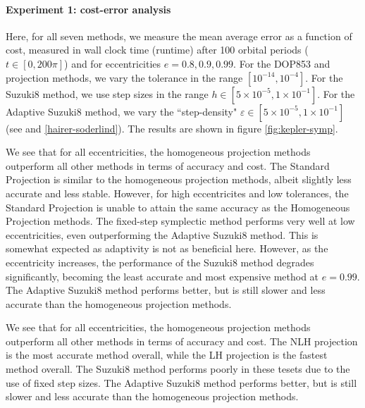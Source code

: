 \documentclass[final,3p,times]{elsarticle}
\begin{document}
\paragraph{Experiment 1: cost-error analysis} Here, for all seven methods, we measure the mean average error as a function of cost, measured in wall clock time (runtime) after 100 orbital periods ($t\in[0, 200\pi]$) and for eccentricities $e=0.8, 0.9, 0.99$. For the DOP853 and projection methods, we vary the tolerance in the range $[10^{-14}, 10^{-4}]$. For the Suzuki8 method, we use step sizes in the range $h\in[5\times 10^{-5}, 1\times 10^{-1}]$. For the Adaptive Suzuki8 method, we vary the ``step-density" $\varepsilon\in[5\times 10^{-5}, 1\times 10^{-1}]$ (see \cite{hairer2005explicit} and \eqref{hairer-soderlind}). The results are shown in figure \ref{fig:kepler-symp}.  

We see that for all eccentricities, the homogeneous projection methods outperform all other methods in terms of accuracy and cost. The Standard Projection is similar to the homogeneous projection methods, albeit slightly less accurate and less stable. However, for high eccentricites and low tolerances, the Standard Projection is unable to attain the same accuracy as the Homogeneous Projection methods. The fixed-step symplectic method performs very well at low eccentricities, even outperforming the Adaptive Suzuki8 method. This is somewhat expected as adaptivity is not as beneficial here. However, as the eccentricity increases, the performance of the Suzuki8 method degrades significantly, becoming the least accurate and most expensive method at $e=0.99$. The Adaptive Suzuki8 method performs better, but is still slower and less accurate than the homogeneous projection methods.

We see that for all eccentricities, the homogeneous projection methods outperform all other methods in terms of accuracy and cost. The NLH projection is the most accurate method overall, while the LH projection is the fastest method overall. The Suzuki8 method performs poorly in these tesets due to the use of fixed step sizes. The Adaptive Suzuki8 method performs better, but is still slower and less accurate than the homogeneous projection methods. 
\end{document}
